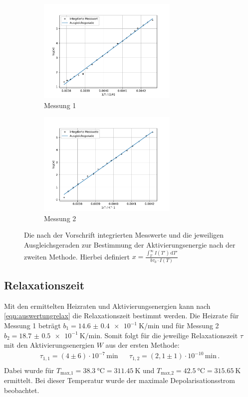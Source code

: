   \begin{figure}[H]
    \begin{subfigure}[b]{.5\linewidth}
      \centering
      \includegraphics[height=5cm, keepaspectratio]{build/log(int)_2durchT_1.pdf}
      \caption{Messung 1}
    \end{subfigure}
    \begin{subfigure}[b]{.5\linewidth}
      \centering
      \includegraphics[height=5cm, keepaspectratio]{build/log(int)_2durchT_2.pdf}
      \caption{Messung 2}
    \end{subfigure}
    \caption{Die nach der Vorschrift integrierten Messwerte und die jeweiligen Ausgleichsgeraden zur Bestimmung der Aktivierungsenergie nach der zweiten Methode.
      Hierbei definiert $x = \frac{\int_T^\infty I(T') \, \text{d}T'}{b \tau_0 \cdot I(T)}$}
    \label{fig:Trapez}
  \end{figure} %

\subsection{Relaxationszeit}
  Mit den ermittelten Heizraten und Aktivierungsenergien kann nach \eqref{eqn:auswertungrelax} die Relaxationszeit bestimmt werden.
  Die Heizrate für Messung 1 beträgt $b_1 = \SI{14.6(04)e-1}{\kelvin\per\minute}$ und für Messung 2 $b_2 = \SI{18.7(05)e-1}{\kelvin\per\minute}$.
  Somit folgt für die jeweilige Relaxationszeit $\tau$ mit den Aktivierungsenergien $W$ aus der ersten Methode:
  \begin{align*}
    \tau_{1,1} = (4\pm 6)\cdot 10^{-7}\,\si{\minute} &&  \tau_{1,2} = (2,1\pm 1)\cdot 10^{-10}\,\si{\minute} \, . \\
  \end{align*}
  Dabei wurde für $T_\text{max,1} = \SI{38.3}{\celsius} = \SI{311.45}{\kelvin} $ und $T_\text{max,2} = \SI{42.5}{\celsius} = \SI{315.65}{\kelvin}$ ermittelt.
  Bei dieser Temperatur wurde der maximale Depolarisationsstrom beobachtet.


